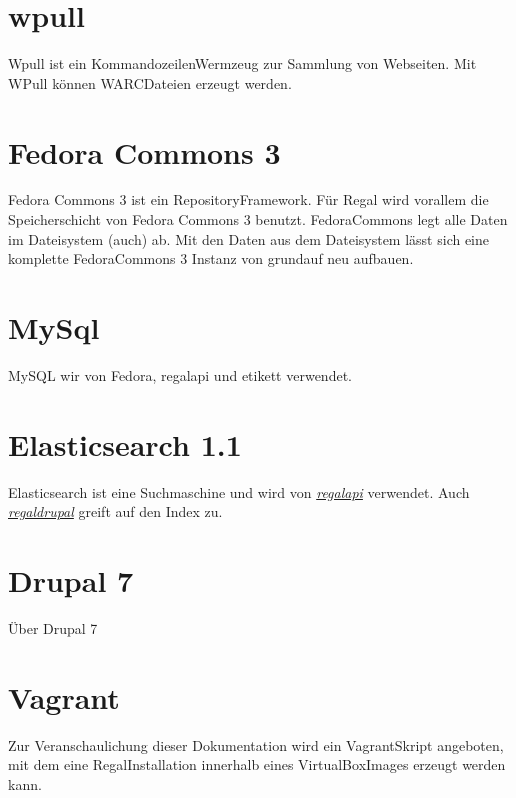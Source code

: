 \documentclass[letterpaper,10pt,english]{sphinxmanual}
\begin{document}
\section{wpull}
\label{\detokenize{toscience:wpull}}\label{\detokenize{toscience:id42}}
\sphinxAtStartPar
Wpull ist ein Kommandozeilen\sphinxhyphen{}Wermzeug zur Sammlung von Webseiten. Mit
WPull können WARC\sphinxhyphen{}Dateien erzeugt werden.


\section{Fedora Commons 3}
\label{\detokenize{toscience:fedora-commons-3}}\label{\detokenize{toscience:id43}}
\sphinxAtStartPar
Fedora Commons 3 ist ein Repository\sphinxhyphen{}Framework. Für Regal wird vorallem
die Speicherschicht von Fedora Commons 3 benutzt. Fedora\sphinxhyphen{}Commons legt
alle Daten im Dateisystem (auch) ab. Mit den Daten aus dem Dateisystem
lässt sich eine komplette Fedora\sphinxhyphen{}Commons 3 Instanz von grundauf neu
aufbauen.


\section{MySql}
\label{\detokenize{toscience:mysql}}\label{\detokenize{toscience:id44}}
\sphinxAtStartPar
MySQL wir von Fedora, regal\sphinxhyphen{}api und etikett verwendet.


\section{Elasticsearch 1.1}
\label{\detokenize{toscience:elasticsearch-1-1}}\label{\detokenize{toscience:id45}}
\sphinxAtStartPar
Elasticsearch ist eine Suchmaschine und wird von
{\hyperref[\detokenize{toscience:_regal_api_2}]{\emph{regal\sphinxhyphen{}api}}} verwendet. Auch
{\hyperref[\detokenize{toscience:_regal_drupal}]{\emph{regal\sphinxhyphen{}drupal}}} greift auf den Index zu.


\section{Drupal 7}
\label{\detokenize{toscience:drupal-7}}\label{\detokenize{toscience:id46}}
\sphinxAtStartPar
Über Drupal 7


\section{Vagrant}
\label{\detokenize{toscience:vagrant}}\label{\detokenize{toscience:id47}}
\sphinxAtStartPar
Zur Veranschaulichung dieser Dokumentation wird ein Vagrant\sphinxhyphen{}Skript
angeboten, mit dem eine Regal\sphinxhyphen{}Installation innerhalb eines
VirtualBox\sphinxhyphen{}Images erzeugt werden kann.
\end{document}

